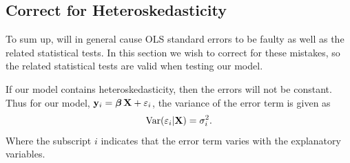




\subsection{Correct for Heteroskedasticity}
To sum up, \hetero will in general cause OLS standard errors to be faulty as well as the related statistical tests. In this section we wish to correct for these mistakes, so the related statistical tests are valid when testing our model. 

If our model contains heteroskedasticity, then the errors will not be constant. Thus for our model, $\mathbf{y}_i = \operatorname{\boldsymbol{\beta}} \mathbf{X} + \varepsilon_i$, the variance of the error term is given as
\begin{align*}
    \operatorname{\text{Var}}(\varepsilon_i | \mathbf{X}) = \sigma^2_i. 
\end{align*}
Where the subscript $i$ indicates that the error term varies with the explanatory variables. 

